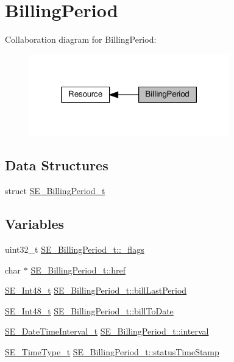 \hypertarget{group__BillingPeriod}{}\section{Billing\+Period}
\label{group__BillingPeriod}
Collaboration diagram for Billing\+Period\+:\nopagebreak
\begin{figure}[H]
\begin{center}
\leavevmode
\includegraphics[width=246pt]{group__BillingPeriod}
\end{center}
\end{figure}
\subsection*{Data Structures}
\begin{DoxyCompactItemize}
\item 
struct \hyperlink{structSE__BillingPeriod__t}{S\+E\+\_\+\+Billing\+Period\+\_\+t}
\end{DoxyCompactItemize}
\subsection*{Variables}
\begin{DoxyCompactItemize}
\item 
uint32\+\_\+t \hyperlink{group__BillingPeriod_gae6a8b09a63ae09613246632c9d15b670}{S\+E\+\_\+\+Billing\+Period\+\_\+t\+::\+\_\+flags}
\item 
char $\ast$ \hyperlink{group__BillingPeriod_ga561582b7871962d2bc055f2aca5b524a}{S\+E\+\_\+\+Billing\+Period\+\_\+t\+::href}
\item 
\hyperlink{group__Int48_ga87620025dc9f6c732fa48fcab95861ce}{S\+E\+\_\+\+Int48\+\_\+t} \hyperlink{group__BillingPeriod_gad93346e423aed2fc21ff583d3496bc27}{S\+E\+\_\+\+Billing\+Period\+\_\+t\+::bill\+Last\+Period}
\item 
\hyperlink{group__Int48_ga87620025dc9f6c732fa48fcab95861ce}{S\+E\+\_\+\+Int48\+\_\+t} \hyperlink{group__BillingPeriod_ga1f0db8a40f5377696dedbdb02875d386}{S\+E\+\_\+\+Billing\+Period\+\_\+t\+::bill\+To\+Date}
\item 
\hyperlink{structSE__DateTimeInterval__t}{S\+E\+\_\+\+Date\+Time\+Interval\+\_\+t} \hyperlink{group__BillingPeriod_gaa9c176ad1af5f803fdbaa6aa0e7c7f4c}{S\+E\+\_\+\+Billing\+Period\+\_\+t\+::interval}
\item 
\hyperlink{group__TimeType_ga6fba87a5b57829b4ff3f0e7638156682}{S\+E\+\_\+\+Time\+Type\+\_\+t} \hyperlink{group__BillingPeriod_ga30652052a4a01d69723c9faf9dd24b29}{S\+E\+\_\+\+Billing\+Period\+\_\+t\+::status\+Time\+Stamp}
\end{DoxyCompactItemize}


